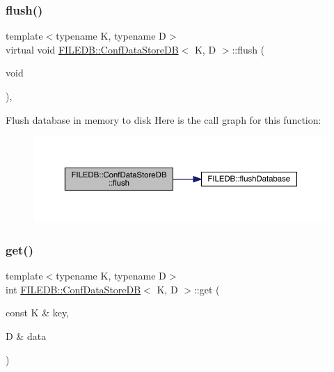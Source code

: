\subsubsection{\texorpdfstring{flush()}{flush()}\hspace{0.1cm}{\footnotesize\ttfamily [3/3]}}
{\footnotesize\ttfamily template$<$typename K, typename D$>$ \\
virtual void \mbox{\hyperlink{classFILEDB_1_1ConfDataStoreDB}{F\+I\+L\+E\+D\+B\+::\+Conf\+Data\+Store\+DB}}$<$ K, D $>$\+::flush (\begin{DoxyParamCaption}\item[{void}]{ }\end{DoxyParamCaption})\hspace{0.3cm}{\ttfamily [inline]}, {\ttfamily [virtual]}}

Flush database in memory to disk Here is the call graph for this function\+:
\nopagebreak
\begin{figure}[H]
\begin{center}
\leavevmode
\includegraphics[width=350pt]{d8/d19/classFILEDB_1_1ConfDataStoreDB_a982ae3b2108acbf75ab15a939fc7871b_cgraph}
\end{center}
\end{figure}
\mbox{\label{classFILEDB_1_1ConfDataStoreDB_ad89d0c1aef7c82fb0273d50bfea7cf0a}} 
\subsubsection{\texorpdfstring{get()}{get()}\hspace{0.1cm}{\footnotesize\ttfamily [1/3]}}
{\footnotesize\ttfamily template$<$typename K, typename D$>$ \\
int \mbox{\hyperlink{classFILEDB_1_1ConfDataStoreDB}{F\+I\+L\+E\+D\+B\+::\+Conf\+Data\+Store\+DB}}$<$ K, D $>$\+::get (\begin{DoxyParamCaption}\item[{const K \&}]{key,  }\item[{D \&}]{data }\end{DoxyParamCaption})\hspace{0.3cm}{\ttfamily [inline]}}

